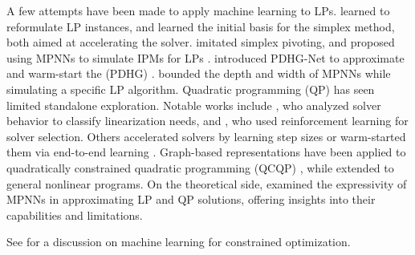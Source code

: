 A few attempts have been made to apply machine learning to LPs. \citet{li2022learning2reform} learned to reformulate LP instances, and \citet{pmlr-v202-fan23d} learned the initial basis for the simplex method, both aimed at accelerating the solver. \citet{liu2024learningpivot} imitated simplex pivoting, and \citet{pmlr-v238-qian24a} proposed using MPNNs to simulate IPMs for LPs \citep{nocedal2006numerical}. \citet{li2024pdhg} introduced PDHG-Net to approximate and warm-start the  (PDHG)  \citep{applegate2021practical,lu2024first}. \citet{li2024onsmallgnn} bounded the depth and width of MPNNs while simulating a specific LP algorithm.
Quadratic programming (QP) has seen limited standalone exploration. Notable works include \citet{bonami2018learning}, who analyzed solver behavior to classify linearization needs, and \citet{pmlr-v157-getzelman21a}, who used reinforcement learning for solver selection. Others accelerated solvers by learning step sizes \citep{ichnowski2021accelerating,jung2022learning} or warm-started them via end-to-end learning \citep{sambharya2023end}. Graph-based representations have been applied to quadratically constrained quadratic programming (QCQP) \citep{wu2024representingqcqp,xiong2024neuralqp}, while \citet{gao2024ipm} extended \citet{pmlr-v238-qian24a} to general nonlinear programs.
On the theoretical side, \citet{chen2022representing,chen2024qp,wu2024representingqcqp} examined the expressivity of MPNNs in approximating LP and QP solutions, offering insights into their capabilities and limitations.

See  for a discussion on machine learning for constrained optimization.